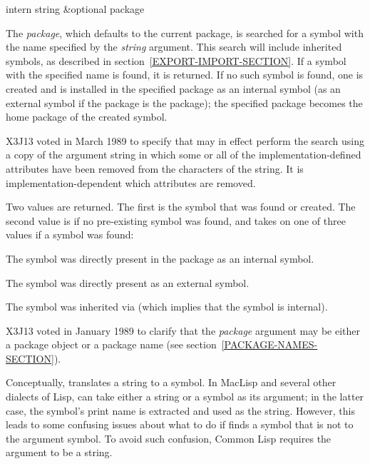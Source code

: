 \begin{defun}[Function]
intern string &optional package

The \emph{package}, which defaults to the current package, is
searched for a symbol with the name specified by the \emph{string}
argument.  This search will include inherited symbols, as described
in section~\ref{EXPORT-IMPORT-SECTION}.
If a symbol with the specified name is found, it is returned.
If no such symbol is found, one is created and is installed in the
specified package as an internal symbol (as an external symbol
if the package is the  package); the specified package becomes the
home package of the created symbol.


\begin{newer}
X3J13 voted in March 1989 
to specify that  may in effect perform the
search using a copy of the argument string in which
some or all of the implementation-defined
attributes have been removed from the characters of the string.
It is implementation-dependent which attributes are removed.
\end{newer}

Two values are returned.  The first is the symbol that was found or
created.  The second value is {\false} if no pre-existing symbol was found,
and takes on one of three values if a symbol was found:
\begin{indentdesc}{6pc}
\item[\cd{:internal}]
The symbol was directly present in the package as an internal symbol.

\item[\cd{:external}]
The symbol was directly present as an external symbol.

\item[\cd{:inherited}]
The symbol was inherited via  (which
implies that the symbol is internal).
\end{indentdesc}

\begin{new}
X3J13 voted in January 1989
to clarify that the \emph{package} argument may be either a package object
or a package name (see section~\ref{PACKAGE-NAMES-SECTION}).
\end{new}

\beforenoterule
\begin{incompatibility}
Conceptually,  translates a
string to a symbol.  In MacLisp and several other dialects of Lisp,
 can take either a string or a symbol as its argument; in the 
latter case, the symbol's print name is extracted and used as the string.  
However, this leads to some confusing issues about what to do if
 finds a symbol that is not  to the argument symbol.  To
avoid such confusion, Common Lisp requires the argument to be a string.
\end{incompatibility}
\afternoterule
\end{defun}

